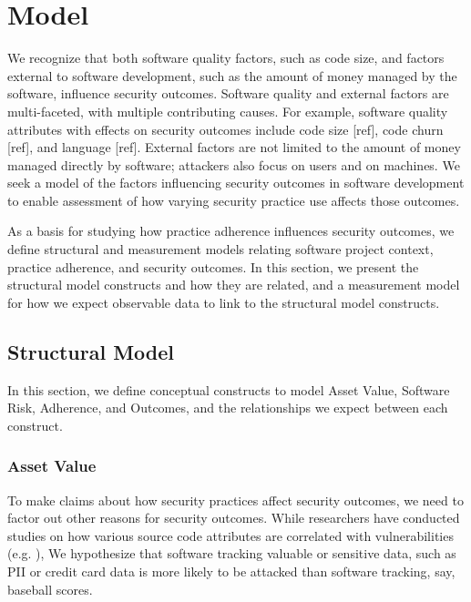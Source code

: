 \section{Model}
\label{sec:model}


 We recognize that both software quality factors, such as code size, and factors external to software development, such as the amount of money managed by the software, influence security outcomes. Software quality and external factors are multi-faceted, with multiple contributing causes. For example, software quality attributes with effects on security outcomes include code size [ref], code churn [ref], and language [ref]. External factors are not limited to the amount of money managed directly by software; attackers also focus on users and on machines.  We seek a model of the factors influencing security outcomes in software development to enable assessment of how varying security practice use affects those outcomes.

As a basis for studying how practice adherence influences security outcomes, we define structural and measurement models relating software project context, practice adherence, and security outcomes. In this section, we present the structural model constructs and how they are related, and a measurement model for how we expect observable data to link to the structural model constructs. 

\subsection{Structural Model}
  
In this section, we define conceptual constructs to model Asset Value, Software Risk, Adherence, and Outcomes, and the relationships we expect between each construct. 

\subsubsection{Asset Value}

To make claims about how security practices affect security outcomes, we need to factor out other reasons for security outcomes. While researchers have conducted studies on how various source code attributes are correlated with vulnerabilities (e.g. ),  We hypothesize that software tracking valuable or sensitive data, such as PII or credit card data is more likely to be attacked than software tracking, say, baseball scores. 

